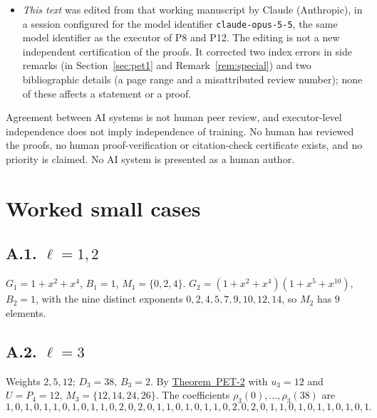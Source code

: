 \documentclass[11pt]{amsart}
\theoremstyle{definition}
\theoremstyle{remark}
\theoremstyle{plain}
\numberwithin{equation}{section}
\newcommand{\PETtwo}{\hyperref[thm:pet2]{Theorem~PET-2}}
\begin{document}
\begin{itemize}[leftmargin=1.6em]
\texttt{gpt-6.1-terra} in Codex, reconciled the theorem labels, adopted documentary corrections
(numerical, indexing and wording errata that changed no statement or proof) and assembled the working
manuscript from which this paper was edited. It was not a new mathematical audit.
\item \emph{This text} was edited from that working manuscript by Claude (Anthropic), in a session
configured for the model identifier \texttt{claude-opus-5-5}, the same model identifier as the
executor of P8 and P12. The editing is not a new independent certification of the proofs. It
corrected two index errors in side remarks (in Section~\ref{sec:pet1} and
Remark~\ref{rem:special}) and two bibliographic details (a page range and a misattributed review
number); none of these affects a statement or a proof.
\end{itemize}
Agreement between AI systems is not human peer review, and executor-level independence does not
imply independence of training. No human has reviewed the proofs, no human proof-verification or
citation-check certificate exists, and no priority is claimed. No AI system is presented as a human
author.




\appendix

\section{Worked small cases}\label{app:examples}

\subsection*{\texorpdfstring{A.1. $\ell=1,2$}{A.1. l=1,2}}
$G_1=1+x^2+x^4$, $B_1=1$, $M_1=\{0,2,4\}$. $G_2=(1+x^2+x^4)(1+x^5+x^{10})$, $B_2=1$, with the nine
distinct exponents $0,2,4,5,7,9,10,12,14$, so $M_2$ has $9$ elements.

\subsection*{\texorpdfstring{A.2. $\ell=3$}{A.2. l=3}}
Weights $2,5,12$; $D_3=38$, $B_3=2$. By \PETtwo{} with $u_3=12$ and $U=P_4=12$,
$M_3=\{12,14,24,26\}$. The coefficients $\rho_3(0),\dots,\rho_3(38)$ are
\[
1,0,1,0,1,1,0,1,0,1,1,0,2,0,2,0,1,1,0,1,0,1,1,0,2,0,2,0,1,1,0,1,0,1,1,0,1,0,1 .
\]
\end{document}
